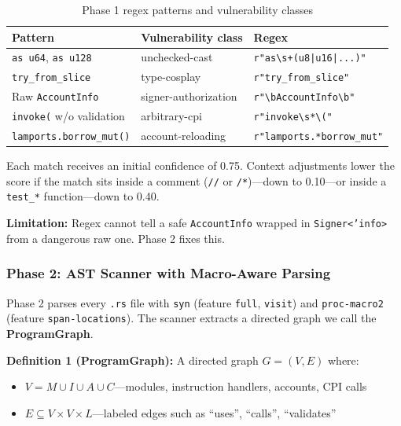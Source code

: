 \documentclass{article}
\begin{document}
\begin{table}[H]
  \caption{Phase 1 regex patterns and vulnerability classes}
  \label{tab:regex}
  \centering
  \begin{tabular}{lll}
    \toprule
    Pattern & Vulnerability class & Regex \\
    \midrule
    \texttt{as u64}, \texttt{as u128} & unchecked-cast & \texttt{r"as\textbackslash s+(u8|u16|...)"} \\
    \texttt{try\_from\_slice} & type-cosplay & \texttt{r"try\_from\_slice"} \\
    Raw \texttt{AccountInfo} & signer-authorization & \texttt{r"\textbackslash bAccountInfo\textbackslash b"} \\
    \texttt{invoke(} w/o validation & arbitrary-cpi & \texttt{r"invoke\textbackslash s*\textbackslash("} \\
    \texttt{lamports.borrow\_mut()} & account-reloading & \texttt{r"lamports.*borrow\_mut"} \\
    \bottomrule
  \end{tabular}
\end{table}

Each match receives an initial confidence of 0.75. Context adjustments lower the score if the match sits inside a comment (\texttt{//} or \texttt{/*})---down to 0.10---or inside a \texttt{test\_*} function---down to 0.40.

\textbf{Limitation:} Regex cannot tell a safe \texttt{AccountInfo} wrapped in \texttt{Signer<'info>} from a dangerous raw one. Phase 2 fixes this.

\subsubsection{Phase 2: AST Scanner with Macro-Aware Parsing}

Phase 2 parses every \texttt{.rs} file with \texttt{syn} (feature \texttt{full}, \texttt{visit}) and \texttt{proc-macro2} (feature \texttt{span-locations}). The scanner extracts a directed graph we call the \textbf{ProgramGraph}.

\textbf{Definition 1 (ProgramGraph):} A directed graph $G = (V, E)$ where:
\begin{itemize}
  \item $V = M \cup I \cup A \cup C$---modules, instruction handlers, accounts, CPI calls
  \item $E \subseteq V \times V \times L$---labeled edges such as ``uses'', ``calls'', ``validates''
\end{itemize}
\end{document}
